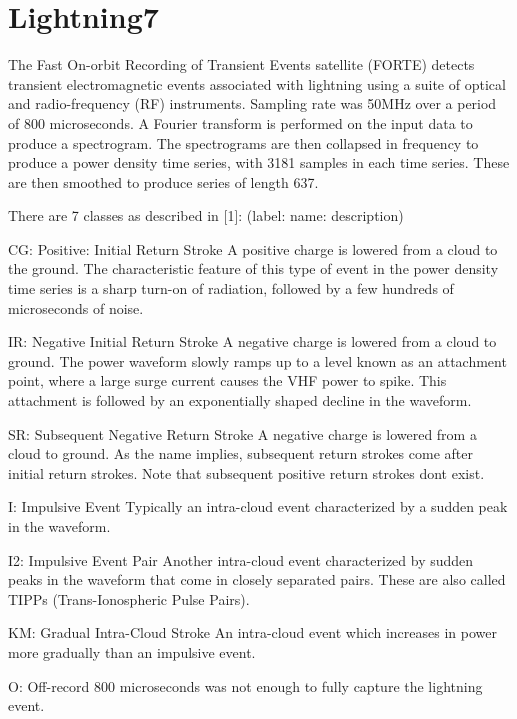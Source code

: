 \chapter{Lightning7}
\hypertarget{md_external_2data_2UCRArchive__2018_2Lightning7_2README}{}\label{md_external_2data_2UCRArchive__2018_2Lightning7_2README}
\label{md_external_2data_2UCRArchive__2018_2Lightning7_2README_autotoc_md135}%
%
 The Fast On-\/orbit Recording of Transient Events satellite (FORTE) detects transient electromagnetic events associated with lightning using a suite of optical and radio-\/frequency (RF) instruments. Sampling rate was 50MHz over a period of 800 microseconds. A Fourier transform is performed on the input data to produce a spectrogram. The spectrograms are then collapsed in frequency to produce a power density time series, with 3181 samples in each time series. These are then smoothed to produce series of length 637.

There are 7 classes as described in \mbox{[}1\mbox{]}\+: (label\+: name\+: description)
\begin{DoxyItemize}
\item CG\+: Positive\+: Initial Return Stroke A positive charge is lowered from a cloud to the ground. The characteristic feature of this type of event in the power density time series is a sharp turn-\/on of radiation, followed by a few hundreds of microseconds of noise.
\item IR\+: Negative Initial Return Stroke A negative charge is lowered from a cloud to ground. The power waveform slowly ramps up to a level known as an attachment point, where a large surge current causes the VHF power to \textquotesingle{}spike\textquotesingle{}. This attachment is followed by an exponentially shaped decline in the waveform.
\item SR\+: Subsequent Negative Return Stroke A negative charge is lowered from a cloud to ground. As the name implies, subsequent return strokes come after initial return strokes. Note that subsequent positive return strokes don\textquotesingle{}t exist.
\item I\+: Impulsive Event Typically an intra-\/cloud event characterized by a sudden peak in the waveform.
\item I2\+: Impulsive Event Pair Another intra-\/cloud event characterized by sudden peaks in the waveform that come in closely separated pairs. These are also called TIPPs (Trans-\/\+Ionospheric Pulse Pairs).
\item KM\+: Gradual Intra-\/\+Cloud Stroke An intra-\/cloud event which increases in power more gradually than an impulsive event.
\item O\+: Off-\/record 800 microseconds was not enough to fully capture the lightning event.
\end{DoxyItemize}

